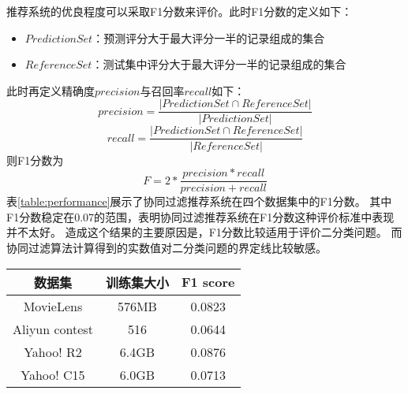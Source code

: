 推荐系统的优良程度可以采取F1分数来评价。此时F1分数的定义如下：
\begin{center}
\begin{itemize}
	\item $PredictionSet$：预测评分大于最大评分一半的记录组成的集合
	\item $ReferenceSet$：测试集中评分大于最大评分一半的记录组成的集合
\end{itemize}
\end{center}
此时再定义精确度$precision$与召回率$recall$如下：
\begin{equation}
precision= \frac{|PredictionSet\cap ReferenceSet|}{|PredictionSet|}
\end{equation}
\begin{equation}
recall= \frac{|PredictionSet\cap ReferenceSet|}{|ReferenceSet|}
\end{equation}
则F1分数为
\begin{equation}
F= 2* \frac{precision*recall}{precision+recall}
\end{equation}
表\ref{table:performance}展示了协同过滤推荐系统在四个数据集中的F1分数。
其中F1分数稳定在0.07的范围，表明协同过滤推荐系统在F1分数这种评价标准中表现并不太好。
造成这个结果的主要原因是，F1分数比较适用于评价二分类问题。
而协同过滤算法计算得到的实数值对二分类问题的界定线比较敏感。
\begin{center}
\label{table:performance}
\begin{tabular}{c|c|c}
 \hline
数据集 & 训练集大小 & F1 score \\ \hline
MovieLens & 576MB & 0.0823 \\ \hline
Aliyun contest & 516 & 0.0644 \\ \hline
Yahoo! R2 & 6.4GB & 0.0876 \\ \hline
Yahoo! C15 & 6.0GB & 0.0713 \\ \hline
\end{tabular}
\end{center}
\pgfplotsset{compat=1.13}
\begin{center}
\label{fig:MCFtest}
\end{center}

